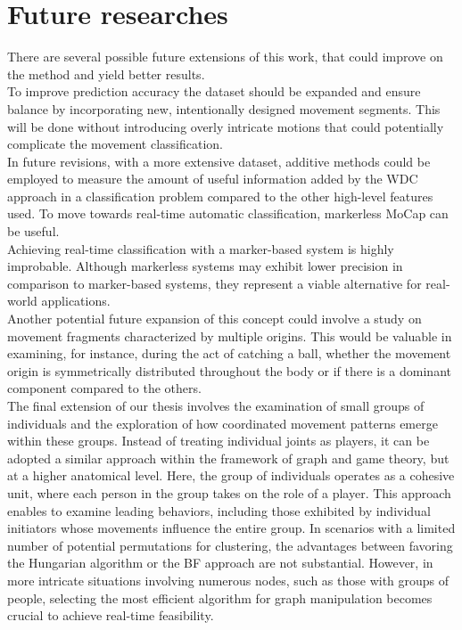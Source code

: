 \clearpage


\section{Future researches}
\label{sec:future_researches}
There are several possible future extensions of this work, that could improve on the method and yield better results. \\

To improve prediction accuracy the dataset should be expanded and ensure balance by incorporating new, intentionally designed movement segments.
This will be done without introducing overly intricate motions that could potentially complicate the movement classification.\\

In future revisions, with a more extensive dataset, additive methods could be employed to measure the amount of useful information added by the WDC approach in a classification problem compared to the other high-level features used.
To move towards real-time automatic classification, markerless MoCap can be useful.\\

Achieving real-time classification with a marker-based system is highly improbable.
Although markerless systems may exhibit lower precision in comparison to marker-based systems, 
they represent a viable alternative for real-world applications.\\

Another potential future expansion of this concept could involve a study on movement fragments characterized by multiple origins.
This would be valuable in examining, for instance, during the act of catching a ball, whether the movement origin is symmetrically distributed throughout the body or if there is a dominant component compared to the others.\\

The final extension of our thesis involves the examination of small groups of individuals and the exploration of how coordinated movement patterns emerge within these groups.
Instead of treating individual joints as players, it can be adopted a similar approach within the framework of graph and game theory, but at a higher anatomical level.
Here, the group of individuals operates as a cohesive unit, where each person in the group takes on the role of a player. 
This approach enables to examine leading behaviors, including those exhibited by individual initiators whose movements influence the entire group.
In scenarios with a limited number of potential permutations for clustering, the advantages between favoring the Hungarian algorithm or the BF approach are not substantial. 
However, in more intricate situations involving numerous nodes, such as those with groups of people, selecting the most efficient algorithm for graph manipulation becomes crucial to achieve real-time feasibility.
